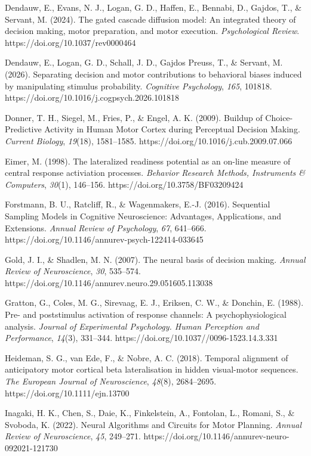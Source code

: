 \begin{references}
Dendauw, E., Evans, N. J., Logan, G. D., Haffen, E., Bennabi, D., Gajdos, T., \& Servant, M. (2024). The gated cascade diffusion model: An integrated theory of decision making, motor preparation, and motor execution. \emph{Psychological Review}. https://doi.org/10.1037/rev0000464

Dendauw, E., Logan, G. D., Schall, J. D., Gajdos Preuss, T., \& Servant, M. (2026). Separating decision and motor contributions to behavioral biases induced by manipulating stimulus probability. \emph{Cognitive Psychology}, \emph{165}, 101818. https://doi.org/10.1016/j.cogpsych.2026.101818

Donner, T. H., Siegel, M., Fries, P., \& Engel, A. K. (2009). Buildup of Choice-Predictive Activity in Human Motor Cortex during Perceptual Decision Making. \emph{Current Biology}, \emph{19}(18), 1581--1585. https://doi.org/10.1016/j.cub.2009.07.066

Eimer, M. (1998). The lateralized readiness potential as an on-line measure of central response activiation processes. \emph{Behavior Research Methods, Instruments \& Computers}, \emph{30}(1), 146--156. https://doi.org/10.3758/BF03209424

Forstmann, B. U., Ratcliff, R., \& Wagenmakers, E.-J. (2016). Sequential Sampling Models in Cognitive Neuroscience: Advantages, Applications, and Extensions. \emph{Annual Review of Psychology}, \emph{67}, 641--666. https://doi.org/10.1146/annurev-psych-122414-033645

Gold, J. I., \& Shadlen, M. N. (2007). The neural basis of decision making. \emph{Annual Review of Neuroscience}, \emph{30}, 535--574. https://doi.org/10.1146/annurev.neuro.29.051605.113038

Gratton, G., Coles, M. G., Sirevaag, E. J., Eriksen, C. W., \& Donchin, E. (1988). Pre- and poststimulus activation of response channels: A psychophysiological analysis. \emph{Journal} \emph{of Experimental Psychology. Human Perception and Performance}, \emph{14}(3), 331--344. https://doi.org/10.1037//0096-1523.14.3.331

Heideman, S. G., van Ede, F., \& Nobre, A. C. (2018). Temporal alignment of anticipatory motor cortical beta lateralisation in hidden visual-motor sequences. \emph{The European Journal of Neuroscience}, \emph{48}(8), 2684--2695. https://doi.org/10.1111/ejn.13700

Inagaki, H. K., Chen, S., Daie, K., Finkelstein, A., Fontolan, L., Romani, S., \& Svoboda, K. (2022). Neural Algorithms and Circuits for Motor Planning. \emph{Annual Review of Neuroscience}, \emph{45}, 249--271. https://doi.org/10.1146/annurev-neuro-092021-121730


\end{references}
